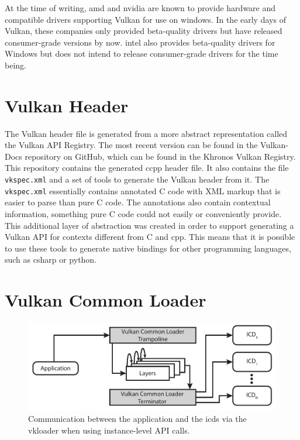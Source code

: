 
    At the time of writing, \gls{amd} and \gls{nvidia} are known to provide hardware and compatible drivers supporting Vulkan for use on \gls{windows}. In the early days of Vulkan, these companies only provided beta-quality \glspl{driver} but have released consumer-grade versions by now. \gls{intel} also provides beta-quality drivers for Windows but does not intend to release consumer-grade \glspl{driver} for the time being\cite{intelvulkandriversonwindows}.

  \section{Vulkan Header}
  \label{sec:VulkanHeader}
    The Vulkan header file is generated from a more abstract representation called the Vulkan API Registry. The most recent version can be found in the Vulkan-Docs repository on GitHub, which can be found in the Khronos Vulkan Registry\cite{vulkanregistry}. This repository contains the generated \gls{ccpp} header file. It also contains the file \lstinline{vkspec.xml} and a set of tools to generate the Vulkan header from it. The \lstinline{vkspec.xml} essentially contains annotated C code with XML markup that is easier to parse than pure C code. The annotations also contain contextual information, something pure C code could not easily or conveniently provide. This additional layer of abstraction was created in order to support generating a Vulkan API for contexts different from C and \gls{cpp}. This means that it is possible to use these tools to generate native bindings for other programming languages, such as \gls{csharp} or \gls{python}.


  \section{Vulkan Common Loader}
  \label{sec:VulkanLoader}

    \begin{figure}
      \includegraphics{Main/Images/VulkanLoaderInstanceLayers}
      \centering
      \caption{Communication between the application and the \glspl{icd} via the \gls{vkloader} when using instance-level API calls.}
      \label{fig:VulkanLoaderWithInstanceLayers}
    \end{figure}

